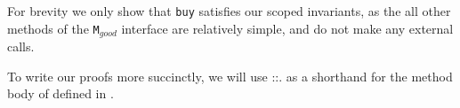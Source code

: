  \label{s:app:example:proofs}
 

 
For brevity we only show that \verb|buy| satisfies our scoped invariants, as the all other methods of 
the \verb|M|$_{good}$ interface are relatively simple, and do not make any external calls. 

{ To write our proofs more succinctly, we will use ::. as a shorthand for the method body of  defined in .}

  

